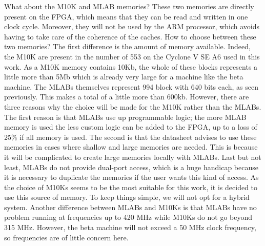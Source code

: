 What about the M10K and MLAB memories? These two memories are directly present on the FPGA, which
 means that they can be read and written in one clock cycle. Moreover, they will not be used by the 
 ARM processor, which avoids having to take care of the coherence of the caches. How to choose 
 between these two memories? The first difference is the amount of memory available. Indeed, the 
 M10K are present in the number of 553 on the Cyclone V SE A6
 used in this work. As a M10K memory 
 contains 10Kb, the whole of these blocks represents a little more than 5Mb which is already very 
 large for a machine like the beta machine. The MLABs themselves represent  
 994 block with 640 bits each, as seen previously. This makes a total of a little more than 600kb. 
 However, there are three reasons why the choice will be made for the M10K rather than the MLABs. 
 The first reason is that MLABs use up programmable logic; the more MLAB memory is used the less 
 custom logic can be added to the FPGA, up to a loss of 25\% if all memory is used. The second is 
 that the datasheet advises to use these memories in cases where shallow and large memories are 
 needed. This is because it will be complicated to create large memories locally with MLABs. Last 
 but not least, MLABs do not provide dual-port access, which is a huge handicap because it is 
 necessary to duplicate the memories if the user wants this kind of access. As the choice of M10Ks 
 seems to be the most suitable for this work, it is decided to use this source of memory.  To keep things simple, we will not opt for a hybrid system.  Another difference between MLABs and M10Ks is that 
 MLABs have no problem running at frequencies up to 420 MHz while M10Ks do not go beyond 315 MHz. 
 However, the beta machine will not exceed a 50 MHz clock frequency, so frequencies are of little concern here.
